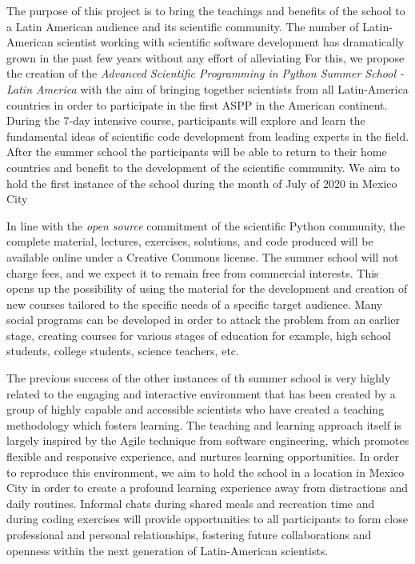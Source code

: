 \documentclass{article}[11pt]
\begin{document}
The purpose of this project is to bring the teachings and benefits of the
school to a Latin American audience and its scientific community. The number of
Latin-American scientist  working with scientific software
development has dramatically grown in the past few years without any effort of
alleviating  For this, we propose the creation of the
\emph{Advanced Scientific Programming in Python Summer School - Latin America}
with the aim of bringing together scientists from all Latin-America countries
in order to participate in the first ASPP in the American continent. During the
7-day intensive course, participants will explore and learn the fundamental
ideas of scientific code development from leading experts in the field. After
the summer school the participants will be able to return to their home
countries and benefit to the development of the scientific community.  We aim to hold the first instance of the school during the month of
July of 2020 in Mexico City   

In line with the \emph{open source} commitment of the scientific Python
community, the complete material, lectures, exercises, solutions, and code
produced will be available online under a Creative Commons license. The summer
school will not charge fees, and we expect it to remain free from commercial
interests. This opens up the possibility of using the material for the
development and creation of new courses tailored to the specific needs of a
specific target audience. Many social programs can be developed in order to
attack the problem from an earlier stage, creating courses for various stages
of education for example, high school students, college students, science
teachers, etc.

The previous success of the other instances of th summer school is very highly
related to the engaging and interactive environment that has been created by a
group of highly capable and accessible scientists who have created a teaching
methodology which fosters learning. The teaching and learning approach itself
is largely inspired by the Agile technique from software engineering, which
promotes flexible and responsive experience, and nurtures learning
opportunities. In order to reproduce this environment, we aim to hold the
school in a  location in Mexico City in order to create a profound
learning experience away from distractions and daily routines. Informal chats
during shared meals and recreation time and during coding exercises will
provide opportunities to all participants to form close professional and
personal relationships, fostering future collaborations and openness within the
next generation of Latin-American scientists.
\end{document}
